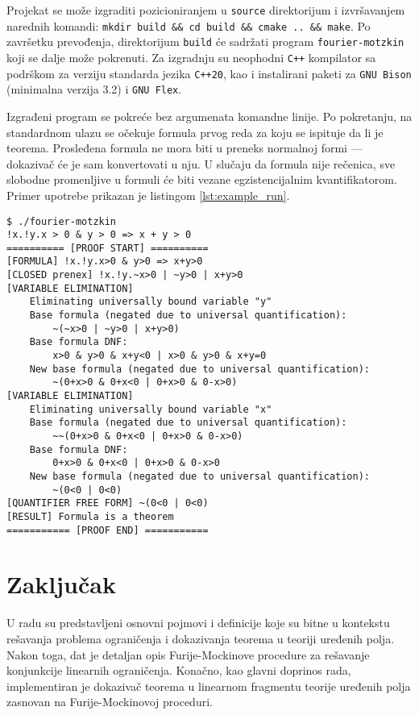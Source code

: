 \documentclass[a4paper,10pt]{article}
\begin{document}
Projekat se može izgraditi pozicioniranjem u \texttt{source} direktorijum i izvršavanjem narednih komandi: \texttt{mkdir build \&\& cd build \&\& cmake .. \&\& make}. Po završetku prevođenja, direktorijum \texttt{build} će sadržati program \texttt{fourier-motzkin} koji se dalje može pokrenuti. Za izgradnju su neophodni \texttt{C++} kompilator sa podrškom za verziju standarda jezika \texttt{C++20}, kao i instalirani paketi za \texttt{GNU Bison} (minimalna verzija 3.2) i \texttt{GNU Flex}.

Izgrađeni program se pokreće bez argumenata komandne linije. Po pokretanju, na standardnom ulazu se očekuje formula prvog reda za koju se ispituje da li je teorema. Prosleđena formula ne mora biti u preneks normalnoj formi --- dokazivač će je sam konvertovati u nju. U slučaju da formula nije rečenica, sve slobodne promenljive u formuli će biti vezane egzistencijalnim kvantifikatorom. Primer upotrebe prikazan je listingom \ref{lst:example_run}.


\begin{lstlisting}[basicstyle=\ttfamily\small,captionpos=b,caption={Primer pokretanja i izvršavanja programa \texttt{fourier-motzkin}}, label=lst:example_run]
$ ./fourier-motzkin
!x.!y.x > 0 & y > 0 => x + y > 0
========== [PROOF START] ==========
[FORMULA] !x.!y.x>0 & y>0 => x+y>0
[CLOSED prenex] !x.!y.~x>0 | ~y>0 | x+y>0
[VARIABLE ELIMINATION]
    Eliminating universally bound variable "y"
    Base formula (negated due to universal quantification):
        ~(~x>0 | ~y>0 | x+y>0)
    Base formula DNF:
        x>0 & y>0 & x+y<0 | x>0 & y>0 & x+y=0
    New base formula (negated due to universal quantification):
        ~(0+x>0 & 0+x<0 | 0+x>0 & 0-x>0)
[VARIABLE ELIMINATION]
    Eliminating universally bound variable "x"
    Base formula (negated due to universal quantification):
        ~~(0+x>0 & 0+x<0 | 0+x>0 & 0-x>0)
    Base formula DNF:
        0+x>0 & 0+x<0 | 0+x>0 & 0-x>0
    New base formula (negated due to universal quantification):
        ~(0<0 | 0<0)
[QUANTIFIER FREE FORM] ~(0<0 | 0<0)
[RESULT] Formula is a theorem
=========== [PROOF END] ===========
\end{lstlisting}

\section{Zaključak}
\label{sec:zakljucak}

U radu su predstavljeni osnovni pojmovi i definicije koje su bitne u kontekstu rešavanja problema ograničenja i dokazivanja teorema u teoriji uređenih polja. Nakon toga, dat je detaljan opis Furije-Mockinove procedure za rešavanje konjunkcije linearnih ograničenja. Konačno, kao glavni doprinos rada, implementiran je dokazivač teorema u linearnom fragmentu teorije uređenih polja zasnovan na Furije-Mockinovoj proceduri.
\end{document}
